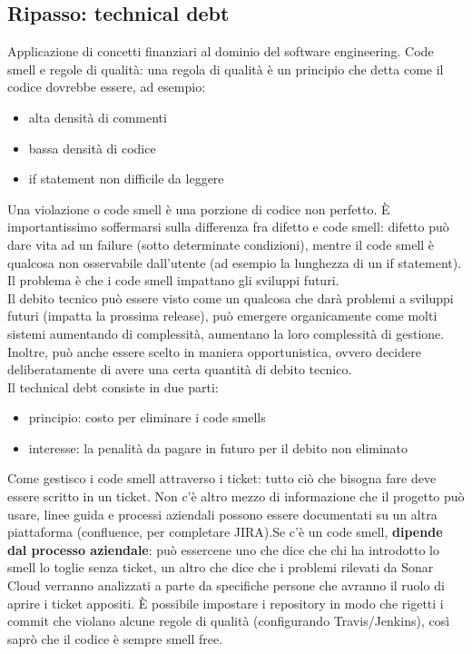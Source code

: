 \documentclass{article}
\begin{document}
\subsection{Ripasso: technical debt}
Applicazione di concetti finanziari al dominio del software engineering. Code smell e regole di qualità: una regola di qualità è un principio che detta come il codice dovrebbe essere, ad esempio:
\begin{itemize}
\item alta densità di commenti
\item bassa densità di codice
\item if statement non difficile da leggere
\end{itemize}
Una violazione o code smell è una porzione di codice non perfetto. È importantissimo soffermarsi sulla differenza fra difetto e code smell: difetto può dare vita ad un failure (sotto determinate condizioni), mentre il code smell è qualcosa non osservabile dall'utente (ad esempio la lunghezza di un if statement). Il problema è che i code smell impattano gli sviluppi futuri.\\ Il debito tecnico può essere visto come un qualcosa che darà problemi a sviluppi futuri (impatta la prossima release), può emergere organicamente come molti sistemi aumentando di complessità, aumentano la loro complessità di gestione. Inoltre, può anche essere scelto in maniera opportunistica, ovvero decidere deliberatamente di avere una certa quantità di debito tecnico.\\ Il technical debt consiste in due parti:
\begin{itemize}
\item principio: costo per eliminare i code smells
\item interesse: la penalità da pagare in futuro per il debito non eliminato
\end{itemize}
Come gestisco i code smell attraverso i ticket: tutto ciò che bisogna fare deve essere scritto in un ticket. Non c'è altro mezzo di informazione che il progetto può usare, linee guida e processi aziendali possono essere documentati su un altra piattaforma (confluence, per completare JIRA).Se c'è un code smell, \textbf{dipende dal processo aziendale}: può essercene uno che dice che chi ha introdotto lo smell lo toglie senza ticket, un altro che dice che i problemi rilevati da Sonar Cloud verranno analizzati a parte da specifiche persone che avranno il ruolo di aprire i ticket appositi. È possibile impostare i repository in modo che rigetti i commit che violano alcune regole di qualità (configurando Travis/Jenkins), così saprò che il codice è sempre smell free.
\end{document}
